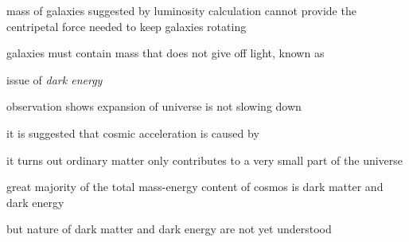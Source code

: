 mass of galaxies suggested by luminosity calculation cannot provide the centripetal force needed to keep galaxies rotating

galaxies must contain mass that does not give off light, known as 

\cmt issue of \emph{dark energy}

observation shows expansion of universe is not slowing down

it is suggested that cosmic acceleration is caused by 

\begin{figure}[ht]
    \centering
    \vspace*{-12pt}
\end{figure}


\cmt it turns out ordinary matter only contributes to a very small part of the universe

great majority of the total mass-energy content of cosmos is dark matter and dark energy

but nature of dark matter and dark energy are not yet understood